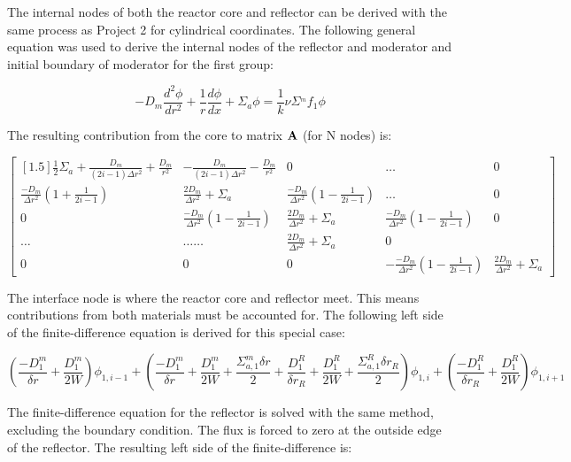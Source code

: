 \documentclass[../main.tex]{subfiles}
\begin{document}
The internal nodes of both the reactor core and reflector can be derived with the same process as Project 2 for cylindrical coordinates.  The following general equation was used to derive the internal nodes of the reflector and moderator  and initial boundary of moderator for the first group:

\begin{equation*}
		-D_m \frac{d^2 \phi}{d r^2} + \frac{1}{r} \frac{d \phi}{dx} + \Sigma_a \phi =   \frac{1}{k} \nu \Sigma^_mf_1 \phi
	\end{equation*}
	


The resulting contribution from the core to matrix $\mathbf{A}$ (for N nodes) is:

\[
	\begin{bmatrix}[1.5]
		\frac{1}{2} \Sigma_a + \frac{D_m}{(2i-1)\Delta r^2} +\frac{D_m}{r^2} & -\frac{D_m}{(2i-1)\Delta r^2} - \frac{D_m}{r^2} & 0 & \dots & 0 \\
		\frac{-D_m}{\Delta r^2} \left( 1 + \frac{1}{2i-1} \right) & \frac{2D_m}{\Delta r^2} + \Sigma_a &  \frac{-D_m}{\Delta r^2} \left( 1 - \frac{1}{2i-1} \right) & \dots & 0 \\
		0 &  \frac{-D_m}{\Delta r^2} \left( 1 - \frac{1}{2i-1} \right) & \frac{2D_m}{\Delta r^2} + \Sigma_a & \frac{-D_m}{\Delta r^2} \left( 1 - \frac{1}{2i-1} \right) & 0\\
		\dots & \dots \dots & \frac{2D_m}{\Delta r^2} + \Sigma_a & 0 \\
		0 & 0 & 0 & -\frac{-D_m}{\Delta r^2} \left( 1 - \frac{1}{2i-1} \right) & \frac{2D_m}{\Delta r^2} + \Sigma_a
	\end{bmatrix}
	\]
	
The interface node is where the reactor core and reflector meet.  This means contributions from both materials must be accounted for.  The following left side of the finite-difference equation is derived for this special case:

	\begin{equation}
	\left( \frac{-D^m_1}{\delta r} + \frac{D^m_1}{2W} \right) \phi_{1,i-1} + \left( \frac{-D^m_1}{\delta r} + \frac{D^m_1}{2W} + \frac{\Sigma^m_{a,1} \delta r}{2} + \frac{D^R_1}{\delta r_R} + \frac{D^R_1}{2W} + \frac{\Sigma^R_{a,1} \delta r_R}{2} \right) \phi_{1,i} + \left( \frac{-D^R_1}{\delta r_R} + \frac{D^R_1}{2W} \right) \phi_{1,i+1}
	\end{equation}
	
The finite-difference equation for the reflector is solved with the same method, excluding the boundary condition.  The flux is forced to zero at the outside edge of the reflector.  The resulting left side of the finite-difference is:
\end{document}
